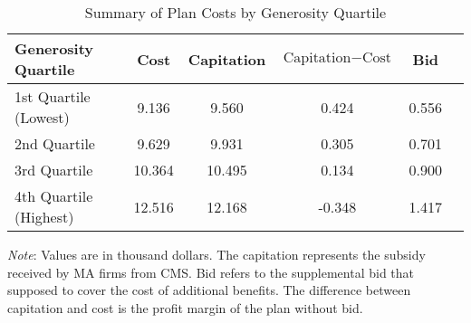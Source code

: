 \begin{table}[ht]
    \centering
    \caption{Summary of Plan Costs by Generosity Quartile}
    \label{tab:result_summary_g}
    \begin{threeparttable}
    \begin{tabular}{@{}lccccc@{}}
    \toprule
    \textbf{Generosity Quartile}  & \textbf{Cost} & \textbf{Capitation} & \textbf{$\text{Capitation}-\text{Cost}$} & \textbf{Bid}   \\ \midrule
    1st Quartile (Lowest)    & 9.136    & 9.560      & 0.424   & 0.556         \\
    2nd Quartile             & 9.629    & 9.931      & 0.305   & 0.701         \\
    3rd Quartile             & 10.364   & 10.495     & 0.134   & 0.900         \\
    4th Quartile (Highest)   & 12.516   & 12.168     & -0.348    & 1.417         \\ \bottomrule
    \end{tabular}
    \footnotesize
    \begin{tablenotes}
        \item \textit{Note}: Values are in thousand dollars. The capitation represents the subsidy received by MA firms from CMS. Bid refers to the supplemental bid that supposed to cover the cost of additional benefits. The difference between capitation and cost is the profit margin of the plan without bid.
    \end{tablenotes}
    \end{threeparttable}
    \end{table}